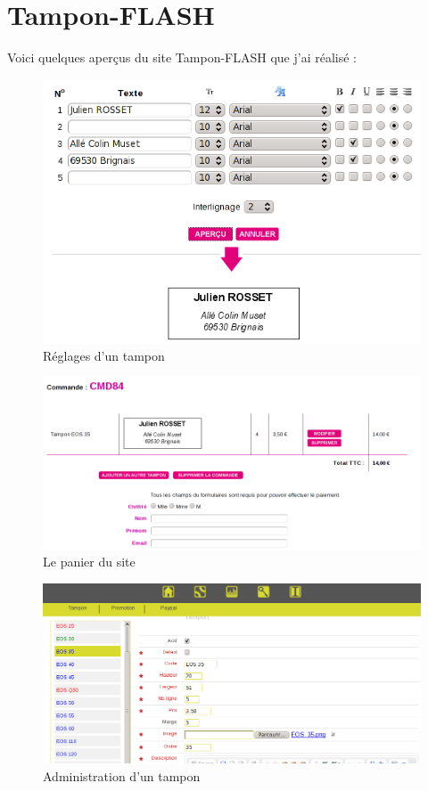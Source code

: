 \chapter{Tampon-FLASH}
\label{annexe_tamponFLASH}
Voici quelques aperçus du site Tampon-FLASH que j'ai réalisé :

\begin{figure}[h!]
	\begin{center}
		\includegraphics[scale=1]{Contenu/Annexes/Images/TamponFLASH_Index.png}
	\end{center}

	\caption{Réglages d'un tampon}
	\label{calendrier}
\end{figure}

\begin{figure}[h!]
	\begin{center}
		\includegraphics[scale=.78]{Contenu/Annexes/Images/TamponFLASH_Panier.png}
	\end{center}

	\caption{Le panier du site}
	\label{calendrier}
\end{figure}

\begin{figure}[h!]
	\begin{center}
		\includegraphics[scale=.9, angle=90]{Contenu/Annexes/Images/TamponFLASH_Admin.png}
	\end{center}

	\caption{Administration d'un tampon}
	\label{calendrier}
\end{figure}
